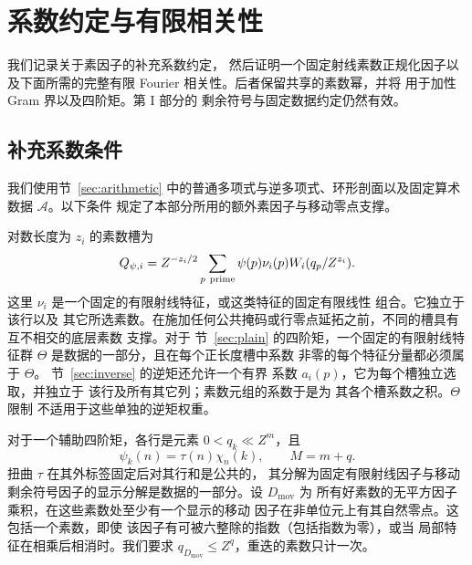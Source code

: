 \documentclass[11pt,a4paper]{article}
\numberwithin{equation}{section}
\numberwithin{figure}{section}
\theoremstyle{definition}
\theoremstyle{remark}
\begin{document}
\section{系数约定与有限相关性}
\label{sec:additional-arithmetic}

我们记录关于素因子的补充系数约定，
然后证明一个固定射线素数正规化因子以及下面所需的完整有限 Fourier
相关性。后者保留共享的素数幂，并将
用于加性 Gram 界以及四阶矩。第 I 部分的
剩余符号与固定数据约定仍然有效。

\subsection{补充系数条件}

我们使用节~\ref{sec:arithmetic} 中的普通多项式与逆多项式、环形剖面以及固定算术
数据 $\mathcal A$。以下条件
规定了本部分所用的额外素因子与移动零点支撑。

对数长度为 $z_i$ 的素数槽为
\begin{equation}
 Q_{\psi,i}=Z^{-z_i/2}\sum_{p\ {\rm prime}}
       \psi(p)\nu_i(p)W_i(q_p/Z^{z_i}).
 \label{old-eq:1.2}
\end{equation}
这里 $\nu_i$ 是一个固定的有限射线特征，或这类特征的固定有限线性
组合。它独立于该行以及
其它所选素数。在施加任何公共掩码或行零点延拓之前，不同的槽具有互不相交的底层素数
支撑。对于
节~\ref{sec:plain} 的四阶矩，一个固定的有限射线特征群 $\Theta$
是数据的一部分，且在每个正长度槽中系数
非零的每个特征分量都必须属于 $\Theta$。
节~\ref{sec:inverse} 的逆矩还允许一个有界
系数 $a_i(p)$，它为每个槽独立选取，并独立于
该行及所有其它列；素数元组的系数于是为
其各个槽系数之积。$\Theta$ 限制
不适用于这些单独的逆矩权重。

对于一个辅助四阶矩，各行是元素 $0<q_k\ll Z^m$，且
\begin{equation}
 \psi_k(n)=\tau(n)\chi_n(k),\qquad M=m+q.
 \label{old-eq:1.3}
\end{equation}
扭曲 $\tau$ 在其外标签固定后对其行和是公共的，
其分解为固定有限射线因子与移动
剩余符号因子的显示分解是数据的一部分。设 $D_{\mathrm{mov}}$ 为
所有好素数的无平方因子乘积，在这些素数处至少有一个显示的移动
因子在非单位元上有其自然零点。这包括一个素数，即使
该因子有可被六整除的指数（包括指数为零），或当
局部特征在相乘后相消时。我们要求
$q_{D_{\mathrm{mov}}}\le Z^q$，重迭的素数只计一次。
\end{document}
